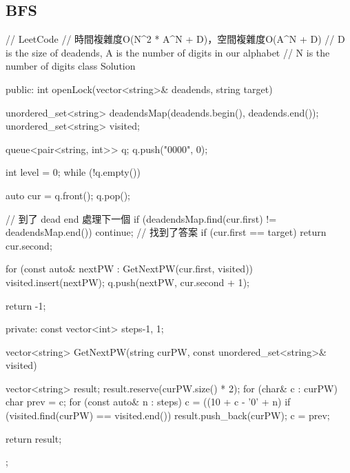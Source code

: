 \subsection{BFS}
\begin{Code}
// LeetCode
// 時間複雜度O(N^2 * A^N + D)，空間複雜度O(A^N + D)
// D is the size of deadends, A is the number of digits in our alphabet
// N is the number of digits
class Solution {
public:
    int openLock(vector<string>& deadends, string target) {
        unordered_set<string> deadendsMap(deadends.begin(), deadends.end());
        unordered_set<string> visited;

        queue<pair<string, int>> q;
        q.push({"0000", 0});

        int level = 0;
        while (!q.empty())
        {
            auto cur = q.front();
            q.pop();

            // 到了 dead end 處理下一個
            if (deadendsMap.find(cur.first) != deadendsMap.end()) continue;
            // 找到了答案
            if (cur.first == target) return cur.second;

            for (const auto& nextPW : GetNextPW(cur.first, visited))
            {
                visited.insert(nextPW);
                q.push({nextPW, cur.second + 1});
            }
        }

        return -1;
    }
private:
    const vector<int> steps{-1, 1};

    vector<string> GetNextPW(string curPW, const unordered_set<string>& visited)
    {
        vector<string> result; result.reserve(curPW.size() * 2);
        for (char& c : curPW)
        {
            char prev = c;
            for (const auto& n : steps)
            {
                c = ((10 + c - '0' + n) %
                if (visited.find(curPW) == visited.end())
                    result.push_back(curPW);
                c = prev;
            }
        }

        return result;
    }
};
\end{Code}

